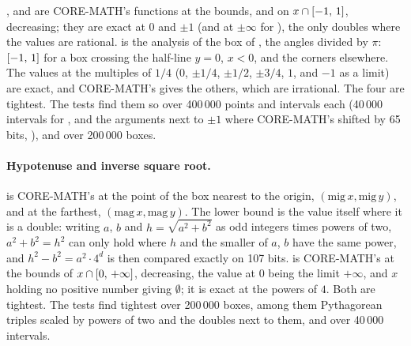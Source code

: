 \documentclass[12pt,a4paper,twoside,openright]{book}
\begin{document}
,  and  are CORE-MATH's
functions at the bounds,  and  on
$x\cap[-1,\,1]$,  decreasing; they are exact at $0$ and
$\pm1$ (and at $\pm\infty$ for ), the only doubles where the
values are rational.\newinvfive{}  is the analysis of
the box of , the angles divided by $\pi$: $[-1,\,1]$ for a
box crossing the half-line $y=0$, $x<0$, and the corners elsewhere. The
values at the multiples of $1/4$ ($0$, $\pm1/4$, $\pm1/2$, $\pm3/4$, $1$,
and $-1$ as a limit) are exact, and CORE-MATH's  gives the
others, which are irrational.\newinvfive{} The four are tightest. The
tests find them so over 400\,000 points and intervals each (40\,000
intervals for , and the arguments next to $\pm1$ where
CORE-MATH's  shifted by 65 bits, ),
and  over 200\,000 boxes.

\paragraph{Hypotenuse and inverse square root.}
 is CORE-MATH's  at the point of the box
nearest to the origin, $(\mathrm{mig}\,x, \mathrm{mig}\,y)$, and at the
farthest, $(\mathrm{mag}\,x, \mathrm{mag}\,y)$. The lower bound is the
value itself where it is a double: writing $a$, $b$ and $h=\sqrt{a^2+b^2}$
as odd integers times powers of two, $a^2+b^2=h^2$ can only hold where $h$
and the smaller of $a$, $b$ have the same power, and $h^2-b^2=a^2\cdot4^d$
is then compared exactly on 107 bits.\newinvfive{}  is
CORE-MATH's  at the bounds of $x\cap[0,\,+\infty]$,
decreasing, the value at $0$ being the limit $+\infty$, and $x$ holding no
positive number giving $\emptyset$; it is exact at the powers of
$4$.\newinvfive{} Both are tightest. The tests find  tightest
over 200\,000 boxes, among them Pythagorean triples scaled by powers of two
and the doubles next to them, and  over 40\,000 intervals.
\end{document}
